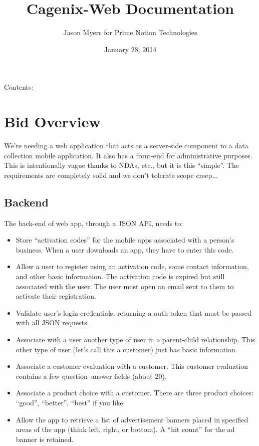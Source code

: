 \documentclass[letterpaper,10pt,english]{sphinxmanual}
\title{Cagenix-Web Documentation}
\date{January 28, 2014}
\author{Jason Myers for Prime Notion Technologies}
\begin{document}
\maketitle
\tableofcontents
{}\label{index::doc}


Contents:


\chapter{Bid Overview}
\label{dev-bid:welcome-to-cagenix-web-s-documentation}\label{dev-bid::doc}\label{dev-bid:bid-overview}
We’re needing a web application that acts as a server-side component to a data collection mobile application. It also has a front-end for administrative purposes. This is intentionally vague thanks to NDAs, etc., but it is this “simple”. The requirements are completely solid and we don’t tolerate scope creep...


\section{Backend}
\label{dev-bid:backend}
The back-end of web app, through a JSON API, needs to:
\begin{itemize}
\item {} 
Store “activation codes” for the mobile apps associated with a person’s business. When a user downloads an app, they have to enter this code.

\item {} 
Allow a user to register using an activation code, some contact information, and other basic information. The activation code is expired but still associated with the user. The user must open an email sent to them to activate their registration.

\item {} 
Validate user’s login credentials, returning a auth token that must be passed with all JSON requests.

\item {} 
Associate with a user another type of user in a parent-child relationship. This other type of user (let’s call this a customer) just has basic information.

\item {} 
Associate a customer evaluation with a customer. This customer evaluation contains a few question–answer fields (about 20).

\item {} 
Associate a product choice with a customer. There are three product choices: “good”, “better”, “best” if you like.

\item {} 
Allow the app to retrieve a list of advertisement banners placed in specified areas of the app (think left, right, or bottom). A “hit count” for the ad banner is retained.

\end{itemize}
\end{document}
